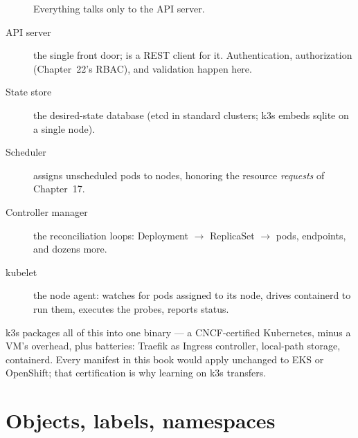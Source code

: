 \begin{figure}[h]
\centering
{}
\caption{Everything talks only to the API server.}
\end{figure}

\begin{description}
  \item[API server] the single front door;  is a REST
  client for it. Authentication, authorization (Chapter~22's RBAC), and
  validation happen here.
  \item[State store] the desired-state database (etcd in standard
  clusters; k3s embeds sqlite on a single node).
  \item[Scheduler] assigns unscheduled pods to nodes, honoring the
  resource \emph{requests} of Chapter~17.
  \item[Controller manager] the reconciliation loops: Deployment
  $\rightarrow$ ReplicaSet $\rightarrow$ pods, endpoints, and dozens
  more.
  \item[kubelet] the node agent: watches for pods assigned to its node,
  drives containerd to run them, executes the probes, reports status.
\end{description}

k3s packages all of this into one binary --- a CNCF-certified
Kubernetes, minus a VM's overhead, plus batteries: Traefik as Ingress
controller, local-path storage, containerd. Every manifest in this
book would apply unchanged to EKS or OpenShift; that certification is
why learning on k3s transfers.

\section{Objects, labels, namespaces}

